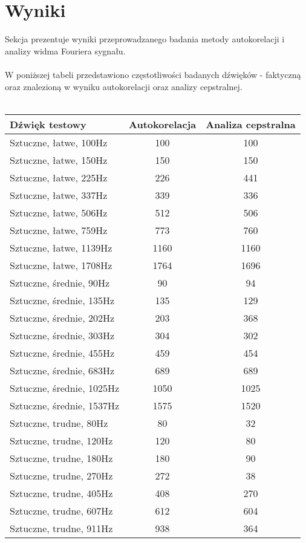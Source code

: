 \documentclass{classrep}
\begin{document}
\section{Wyniki}
Sekcja prezentuje wyniki przeprowadzanego badania metody autokorelacji i analizy widma Fouriera sygnału.\\ 
\\
W poniższej tabeli przedstawiono częstotliwości badanych dźwięków - faktyczną oraz znalezioną w wyniku autokorelacji oraz analizy cepstralnej.\\
\\
\begin{tabular}{ l | c | c }
  \hline
  Dźwięk testowy & Autokorelacja & Analiza cepstralna \\
  \hline			
  Sztuczne, łatwe, 100Hz & 100 & 100 \\
  Sztuczne, łatwe, 150Hz & 150 & 150 \\
  Sztuczne, łatwe, 225Hz & 226 & 441 \\
  Sztuczne, łatwe, 337Hz & 339 & 336 \\
  Sztuczne, łatwe, 506Hz & 512 & 506 \\
  Sztuczne, łatwe, 759Hz & 773 & 760 \\
  Sztuczne, łatwe, 1139Hz & 1160 & 1160 \\
  Sztuczne, łatwe, 1708Hz & 1764 & 1696 \\
  \hline
  Sztuczne, średnie, 90Hz & 90 & 94 \\
  Sztuczne, średnie, 135Hz & 135 & 129 \\
  Sztuczne, średnie, 202Hz & 203 & 368 \\
  Sztuczne, średnie, 303Hz & 304 & 302 \\
  Sztuczne, średnie, 455Hz & 459 & 454 \\
  Sztuczne, średnie, 683Hz & 689 & 689 \\
  Sztuczne, średnie, 1025Hz & 1050 & 1025 \\
  Sztuczne, średnie, 1537Hz & 1575 & 1520 \\
  \hline 
  Sztuczne, trudne, 80Hz & 80 & 32 \\
  Sztuczne, trudne, 120Hz & 120 & 80 \\
  Sztuczne, trudne, 180Hz & 180 & 90 \\
  Sztuczne, trudne, 270Hz & 272 & 38 \\
  Sztuczne, trudne, 405Hz & 408 & 270 \\
  Sztuczne, trudne, 607Hz & 612 & 604 \\
  Sztuczne, trudne, 911Hz & 938 & 364 \\

\end{tabular}
\end{document}
